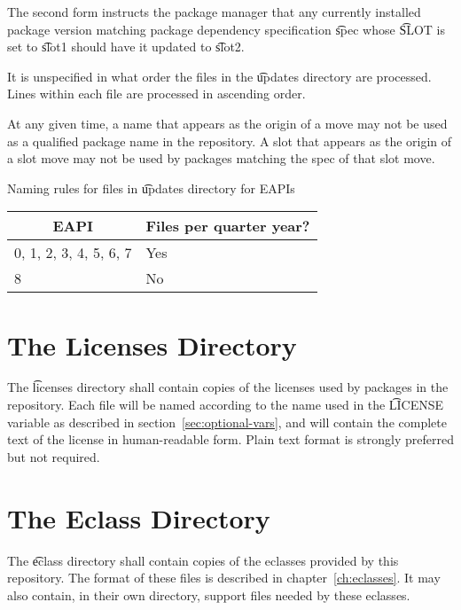 The second form instructs the package manager that any currently installed package version matching
package dependency specification \t{spec} whose \t{SLOT} is set to \t{slot1} should have it updated
to \t{slot2}.

It is unspecified in what order the files in the \t{updates} directory are processed. Lines within
each file are processed in ascending order.

At any given time, a name that appears as the origin of a move may not be used as a qualified
package name in the repository. A slot that appears as the origin of a slot move may not be used
by packages matching the spec of that slot move.

\begin{centertable}{Naming rules for files in \t{updates} directory for EAPIs}
    \label{tab:updates-filenames}
    \begin{tabular}{ll}
      \toprule
      \multicolumn{1}{c}{\textbf{EAPI}} &
      \multicolumn{1}{c}{\textbf{Files per quarter year?}} \\
      \midrule
      0, 1, 2, 3, 4, 5, 6, 7  & Yes \\
      8                       & No  \\
      \bottomrule
    \end{tabular}
\end{centertable}

\section{The Licenses Directory}
\label{sec:licenses-dir}

The \t{licenses} directory shall contain copies of the licenses used by packages in the
repository. Each file will be named according to the name used in the \t{LICENSE} variable as
described in section~\ref{sec:optional-vars}, and will contain the complete text of the license in
human-readable form. Plain text format is strongly preferred but not required.

\section{The Eclass Directory}
\label{sec:eclass-dir}

The \t{eclass} directory shall contain copies of the eclasses provided by this repository. The
format of these files is described in chapter~\ref{ch:eclasses}. It may also contain, in their own
directory, support files needed by these eclasses.

